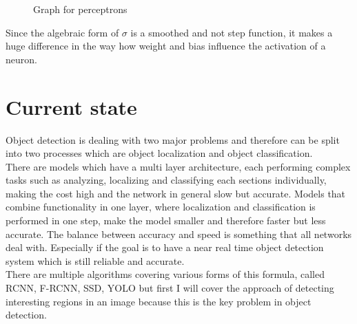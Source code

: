 \begin{figure}[hbt!]
    \begin{center}
\caption{Graph for perceptrons}
\end{center}
\end{figure}
\vspace{0.25cm}
Since the algebraic form of {$\sigma$} is a smoothed and not step function, it makes a huge difference in the way how weight and bias influence
the activation of a neuron.

\section{Current state}
Object detection is dealing with two major problems and therefore can be split into two processes which are object localization and object
classification.  \\
There are models which have a multi layer architecture, each performing complex tasks such as analyzing, localizing and classifying each
sections individually, making the cost high and the network in general slow but accurate.
Models that combine functionality in one layer, where localization and classification is performed in one step, make the
model smaller and therefore faster but less accurate.
The balance between accuracy and speed is something that all networks deal with. Especially if the goal is to have a near real time object
detection system which is still reliable and accurate.\\
There are multiple algorithms covering various forms of this formula, called RCNN, F-RCNN, SSD, YOLO but first I will cover
the approach of detecting interesting regions in an image because this is the key problem in object detection.

